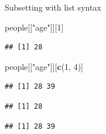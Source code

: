 \documentclass[ignorenonframetext,]{beamer}
\newenvironment{Shaded}{\begin{snugshade}}{\end{snugshade}}
\newcommand{\DecValTok}[1]{\textcolor[rgb]{0.00,0.00,0.81}{#1}}
\newcommand{\KeywordTok}[1]{\textcolor[rgb]{0.13,0.29,0.53}{\textbf{#1}}}
\newcommand{\NormalTok}[1]{#1}
\newcommand{\OperatorTok}[1]{\textcolor[rgb]{0.81,0.36,0.00}{\textbf{#1}}}
\newcommand{\StringTok}[1]{\textcolor[rgb]{0.31,0.60,0.02}{#1}}
\begin{document}
\begin{frame}[fragile]{Subsetting with list syntax}
\protect\hypertarget{subsetting-with-list-syntax-4}{}

\begin{Shaded}
\begin{Highlighting}[]
\NormalTok{people[[}\StringTok{"age"}\NormalTok{]][}\DecValTok{1}\NormalTok{]}
\end{Highlighting}
\end{Shaded}

\begin{verbatim}
## [1] 28
\end{verbatim}

\begin{Shaded}
\begin{Highlighting}[]
\NormalTok{people[[}\StringTok{"age"}\NormalTok{]][}\KeywordTok{c}\NormalTok{(}\DecValTok{1}\NormalTok{, }\DecValTok{4}\NormalTok{)]}
\end{Highlighting}
\end{Shaded}

\begin{verbatim}
## [1] 28 39
\end{verbatim}

\begin{Shaded}
\end{Shaded}

\begin{verbatim}
## [1] 28
\end{verbatim}

\begin{Shaded}
\end{Shaded}

\begin{verbatim}
## [1] 28 39
\end{verbatim}

\end{frame}
\end{document}
